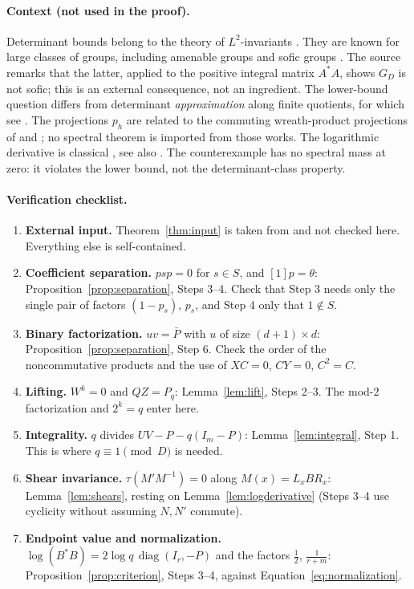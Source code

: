 \documentclass[11pt]{article}
\theoremstyle{remark}
\numberwithin{equation}{section}
\newcommand{\diag}{\operatorname{diag}}
\begin{document}
\paragraph{Context (not used in the proof).} Determinant bounds belong to the theory of $L^2$-invariants \cite{Luck2002}. They are known for large classes of groups, including amenable groups \cite[Theorem 1.21, with its erratum]{Schick2001} and sofic groups \cite[Theorem 5]{ElekSzabo2005}. The source remarks that the latter, applied to the positive integral matrix $A^*A$, shows $G_D$ is not sofic; this is an external consequence, not an ingredient. The lower-bound question differs from determinant \emph{approximation} along finite quotients, for which see \cite[Theorem 2 and Section 2]{Kammeyer2026}. The projections $p_h$ are related to the commuting wreath-product projections of \cite[Section 3]{DicksSchick2002} and \cite[Section 2]{LehnerNeuhauserWoess2008}; no spectral theorem is imported from those works. The logarithmic derivative is classical \cite[Lemma 2]{FK1952}, see also \cite[Lemma 1 and Proposition 2(d)]{deLaHarpeSkandalis1984}. The counterexample has no spectral mass at zero: it violates the lower bound, not the determinant-class property.

\paragraph{Verification checklist.}
\begin{enumerate}[leftmargin=2.2em,itemsep=2pt]
\item \textbf{External input.} Theorem~\ref{thm:input} is taken from \cite{CharacteristicTwo} and not checked here. Everything else is self-contained.
\item \textbf{Coefficient separation.} $psp=0$ for $s\in S$, and $[1]p=\theta$: Proposition~\ref{prop:separation}, Steps 3--4. Check that Step 3 needs only the single pair of factors $(1-p_s)$, $p_s$, and Step 4 only that $1\notin S$.
\item \textbf{Binary factorization.} $uv=\bar P$ with $u$ of size $(d+1)\times d$: Proposition~\ref{prop:separation}, Step 6. Check the order of the noncommutative products and the use of $XC=0$, $CY=0$, $C^2=C$.
\item \textbf{Lifting.} $W^k=0$ and $QZ=P_q$: Lemma~\ref{lem:lift}, Steps 2--3. The mod-$2$ factorization and $2^k=q$ enter here.
\item \textbf{Integrality.} $q$ divides $UV-P-q(I_m-P)$: Lemma~\ref{lem:integral}, Step 1. This is where $q\equiv1\pmod D$ is needed.
\item \textbf{Shear invariance.} $\tau(M'M^{-1})=0$ along $M(x)=L_xBR_x$: Lemma~\ref{lem:shears}, resting on Lemma~\ref{lem:logderivative} (Steps 3--4 use cyclicity without assuming $N,N'$ commute).
\item \textbf{Endpoint value and normalization.} $\log(B^*B)=2\log q\,\diag(I_r,-P)$ and the factors $\frac12$, $\frac1{r+m}$: Proposition~\ref{prop:criterion}, Steps 3--4, against Equation~\eqref{eq:normalization}.
\end{enumerate}

\begingroup
\raggedright


\endgroup
\end{document}
